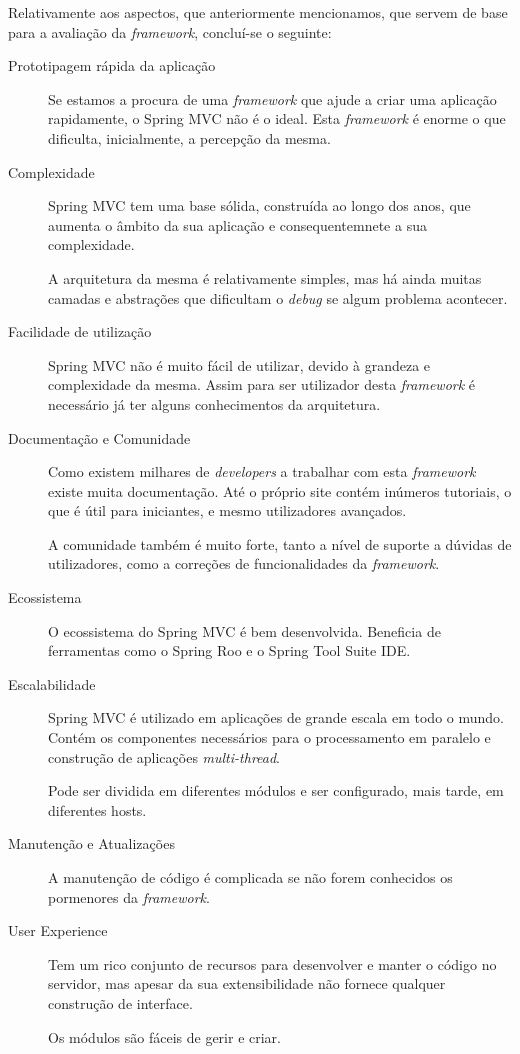 Relativamente aos aspectos, que anteriormente mencionamos, que servem de base para a avaliação da \textit{framework}, concluí-se o seguinte:

\begin{description}

\item[Prototipagem rápida da aplicação] Se estamos a procura de uma \textit{framework} que ajude a criar uma aplicação rapidamente, o Spring MVC não é o ideal. Esta \textit{framework} é enorme o que dificulta, inicialmente, a percepção da mesma.

\item[Complexidade] Spring MVC tem uma base sólida, construída ao longo dos anos, que aumenta o âmbito da sua aplicação e consequentemnete a sua complexidade.

A arquitetura da mesma é relativamente simples, mas há ainda muitas camadas e abstrações que dificultam o \textit{debug} se algum problema acontecer.

\item[Facilidade de utilização] Spring MVC não é muito fácil de utilizar, devido à grandeza e complexidade da mesma. Assim para ser utilizador desta \textit{framework} é necessário já ter alguns conhecimentos da arquitetura.

\item[Documentação e Comunidade] Como existem milhares de \textit{developers} a trabalhar com esta \textit{framework} existe muita documentação. Até o próprio site contém inúmeros tutoriais, o que é útil para iniciantes, e mesmo utilizadores avançados.

A comunidade também é muito forte, tanto a nível de suporte a dúvidas de utilizadores, como a correções de funcionalidades da \textit{framework}.

\item[Ecossistema] O ecossistema do Spring MVC é bem desenvolvida. Beneficia de ferramentas como o Spring Roo e o Spring Tool Suite IDE.

\item[Escalabilidade] Spring MVC é utilizado em aplicações de grande escala em todo o mundo. Contém os componentes necessários para o processamento em paralelo e construção de aplicações \textit{multi-thread}.

Pode ser dividida em diferentes módulos e ser configurado, mais tarde, em diferentes hosts.

\item[Manutenção e Atualizações] A manutenção de código é complicada se não forem conhecidos os pormenores da \textit{framework}.

\item[User Experience] Tem um rico conjunto de recursos para desenvolver e manter o código no servidor, mas apesar da sua extensibilidade não fornece qualquer construção de interface.

Os módulos são fáceis de gerir e criar.\\

\end{description}

